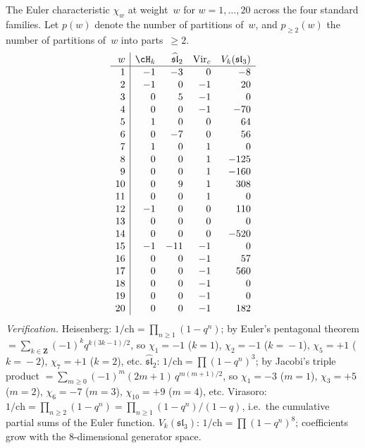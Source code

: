 \begin{computation}
\label{comp:euler-chi-table}
The Euler characteristic $\chi_w$ at weight~$w$ for
$w=1,\ldots,20$ across the four standard families.
Let $p(w)$ denote the number of partitions of~$w$, and
$p_{\ge 2}(w)$ the number of partitions of~$w$ into
parts~$\ge 2$.
\[
\renewcommand{\arraystretch}{1.05}
\begin{array}{r|rrrr}
w & \cH_k & \widehat{\mathfrak{sl}}_2
 & \mathrm{Vir}_c & V_k(\mathfrak{sl}_3)
 \\
\hline
 1 & -1 & -3 & 0 & -8 \\
 2 & -1 & 0 & -1 & 20 \\
 3 & 0 & 5 & -1 & 0 \\
 4 & 0 & 0 & -1 & -70 \\
 5 & 1 & 0 & 0 & 64 \\
 6 & 0 & -7 & 0 & 56 \\
 7 & 1 & 0 & 1 & 0 \\
 8 & 0 & 0 & 1 & -125 \\
 9 & 0 & 0 & 1 & -160 \\
10 & 0 & 9 & 1 & 308 \\
11 & 0 & 0 & 1 & 0 \\
12 & -1 & 0 & 0 & 110 \\
13 & 0 & 0 & 0 & 0 \\
14 & 0 & 0 & 0 & -520 \\
15 & -1 & -11 & -1 & 0 \\
16 & 0 & 0 & -1 & 57 \\
17 & 0 & 0 & -1 & 560 \\
18 & 0 & 0 & -1 & 0 \\
19 & 0 & 0 & -1 & 0 \\
20 & 0 & 0 & -1 & 182
\end{array}
\]
\emph{Verification.}
Heisenberg: $1/\mathrm{ch}=\prod_{n\ge 1}(1-q^n)$;
by Euler's pentagonal theorem
$=\sum_{k\in\mathbf{Z}}(-1)^k q^{k(3k-1)/2}$,
so $\chi_1=-1$ ($k\!=\!1$), $\chi_2=-1$ ($k\!=\!{-}1$),
$\chi_5=+1$ ($k\!=\!{-}2$), $\chi_7=+1$ ($k\!=\!2$), etc.
$\widehat{\mathfrak{sl}}_2$:
$1/\mathrm{ch}=\prod(1-q^n)^3$;
by Jacobi's triple product
$=\sum_{m\ge 0}(-1)^m(2m+1)\,q^{m(m+1)/2}$,
so $\chi_1=-3$ ($m\!=\!1$), $\chi_3=+5$ ($m\!=\!2$),
$\chi_6=-7$ ($m\!=\!3$), $\chi_{10}=+9$ ($m\!=\!4$), etc.
Virasoro:
$1/\mathrm{ch}=\prod_{n\ge 2}(1-q^n)
=\prod_{n\ge 1}(1-q^n)/(1-q)$, i.e.\ the
cumulative partial sums of the Euler function.
$V_k(\mathfrak{sl}_3)$:
$1/\mathrm{ch}=\prod(1-q^n)^8$; coefficients grow
with the $8$-dimensional generator space.


\end{computation}
